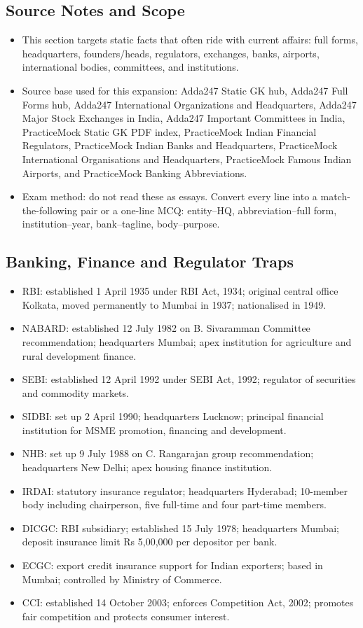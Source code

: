 \documentclass[10pt,a4paper]{article}
\begin{document}
\subsection{Source Notes and Scope}
\begin{itemize}
    \item This section targets static facts that often ride with current affairs: full forms, headquarters, founders/heads, regulators, exchanges, banks, airports, international bodies, committees, and institutions.
    \item Source base used for this expansion: Adda247 Static GK hub, Adda247 Full Forms hub, Adda247 International Organizations and Headquarters, Adda247 Major Stock Exchanges in India, Adda247 Important Committees in India, PracticeMock Static GK PDF index, PracticeMock Indian Financial Regulators, PracticeMock Indian Banks and Headquarters, PracticeMock International Organisations and Headquarters, PracticeMock Famous Indian Airports, and PracticeMock Banking Abbreviations.
    \item Exam method: do not read these as essays. Convert every line into a match-the-following pair or a one-line MCQ: entity--HQ, abbreviation--full form, institution--year, bank--tagline, body--purpose.
\end{itemize}

\subsection{Banking, Finance and Regulator Traps}
\begin{itemize}
    \item RBI: established 1 April 1935 under RBI Act, 1934; original central office Kolkata, moved permanently to Mumbai in 1937; nationalised in 1949.
    \item NABARD: established 12 July 1982 on B. Sivaramman Committee recommendation; headquarters Mumbai; apex institution for agriculture and rural development finance.
    \item SEBI: established 12 April 1992 under SEBI Act, 1992; regulator of securities and commodity markets.
    \item SIDBI: set up 2 April 1990; headquarters Lucknow; principal financial institution for MSME promotion, financing and development.
    \item NHB: set up 9 July 1988 on C. Rangarajan group recommendation; headquarters New Delhi; apex housing finance institution.
    \item IRDAI: statutory insurance regulator; headquarters Hyderabad; 10-member body including chairperson, five full-time and four part-time members.
    \item DICGC: RBI subsidiary; established 15 July 1978; headquarters Mumbai; deposit insurance limit Rs 5,00,000 per depositor per bank.
    \item ECGC: export credit insurance support for Indian exporters; based in Mumbai; controlled by Ministry of Commerce.
    \item CCI: established 14 October 2003; enforces Competition Act, 2002; promotes fair competition and protects consumer interest.
\end{itemize}
\end{document}
